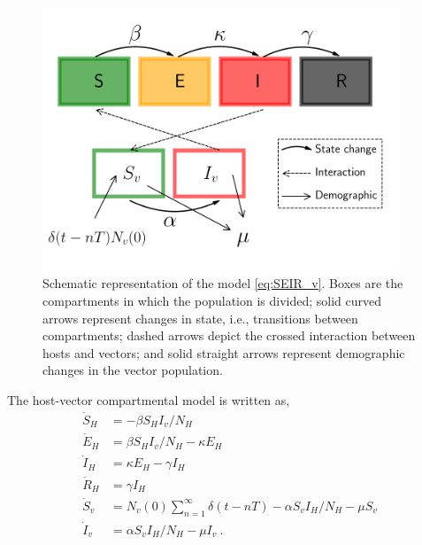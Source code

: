 \begin{figure}[H]
    \centering
    \includegraphics[width=0.95\textwidth]{Figures/SEIR_v_scheme.pdf}
    \caption[Schematic representation of the model]{Schematic representation of
        the model \cref{eq:SEIR_v}. Boxes
        are the compartments in which the population is divided; solid curved
        arrows represent changes in state, i.e., transitions between
        compartments; dashed arrows depict the crossed interaction between
        hosts and vectors; and solid straight arrows represent demographic
        changes in the vector population.}
    \label{fig:model_diagram_phyto}
\end{figure}

The host-vector compartmental model is written as,
\begin{equation}\label{eq:SEIR_v}
    \begin{aligned}
        \dot{S}_H & =-\beta S_H I_v / N_H                                   \\
        \dot{E}_H & =\beta S_H I_v / N_H - \kappa E_H                       \\
        \dot{I}_H & =\kappa E_H - \gamma I_H                                \\
        \dot{R}_H & =\gamma I_H                                             \\
        \dot{S}_v & = N_v(0)\sum_{n=1}^{\infty}\delta(t-nT) -\alpha S_v I_H
        / N_H - \mu S_v                                                     \\
        \dot{I}_v & =\alpha S_v I_H / N_H - \mu I_v \ .
    \end{aligned}
\end{equation}

